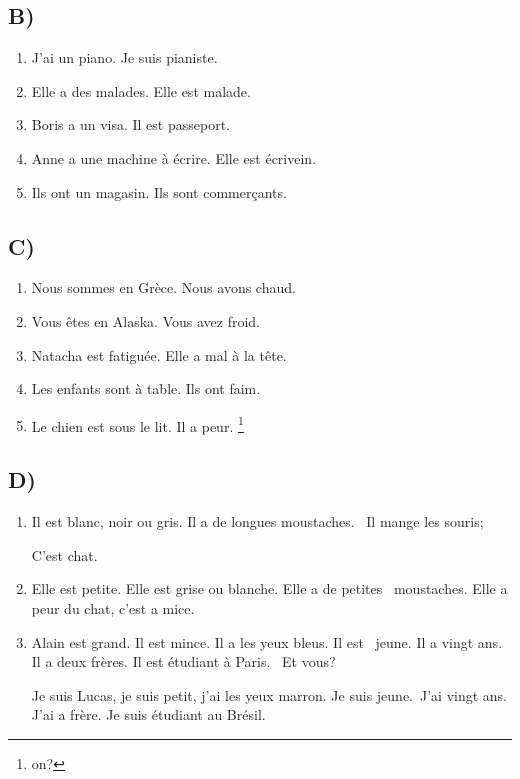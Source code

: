 \subsection*{B)}

\begin{enumerate}
    \item J'ai un piano. Je suis pianiste.
    \item Elle a des malades. Elle est malade.
    \item Boris a un visa. Il est passeport.
    \item Anne a une machine à écrire. Elle est écrivein.
    \item Ils ont un magasin. Ils sont commerçants. 
\end{enumerate}

\subsection*{C)}

\begin{enumerate}
    \item Nous sommes en Grèce. Nous avons chaud.
    \item Vous êtes en Alaska. Vous avez froid.
    \item Natacha est fatiguée. Elle a mal à la tête.
    \item Les enfants sont à table. Ils ont faim.
    \item Le chien est sous le lit. Il a peur. \footnote{on?}
\end{enumerate}

\subsection*{D)}

\begin{enumerate}
    \item Il est blanc, noir ou gris. Il a de longues moustaches. \
    Il mange les souris; \

    C'est chat.
    \item Elle est petite. Elle est grise ou blanche. Elle a de petites \
    moustaches. Elle a peur du chat, c'est a mice.

    \item Alain est grand. Il est mince. Il a les yeux bleus. Il est \
    jeune. Il a vingt ans. Il a deux frères. Il est étudiant à Paris. \ 
    Et vous?

    Je suis Lucas, je suis petit, j'ai les yeux marron. Je suis jeune.\ 
    J'ai vingt ans. J'ai a frère. Je suis étudiant au Brésil.
\end{enumerate}